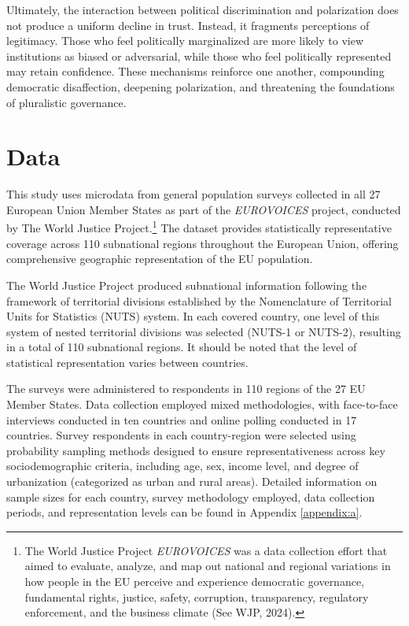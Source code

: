\documentclass{article}
\begin{document}
Ultimately, the interaction between political discrimination and polarization does not produce a uniform decline in trust. Instead, it fragments perceptions of legitimacy. Those who feel politically marginalized are more likely to view institutions as biased or adversarial, while those who feel politically represented may retain confidence. These mechanisms reinforce one another, compounding democratic disaffection, deepening polarization, and threatening the foundations of pluralistic governance.

\section{Data}

This study uses microdata from general population surveys collected in all 27 European Union Member States as part of the \emph{EUROVOICES} project, conducted by The World Justice Project.\footnote{The World Justice Project \emph{EUROVOICES} was a data collection effort that aimed to evaluate, analyze, and map out national and regional variations in how people in the EU perceive and experience democratic governance, fundamental rights, justice, safety, corruption, transparency, regulatory enforcement, and the business climate (See WJP, 2024).} The dataset provides statistically representative coverage across 110 subnational regions throughout the European Union, offering comprehensive geographic representation of the EU population.

The World Justice Project produced subnational information following the framework of territorial divisions established by the Nomenclature of Territorial Units for Statistics (NUTS) system. In each covered country, one level of this system of nested territorial divisions was selected (NUTS-1 or NUTS-2), resulting in a total of 110 subnational regions. It should be noted that the level of statistical representation varies between countries.

The surveys were administered to respondents in 110 regions of the 27 EU Member States. Data collection employed mixed methodologies, with face-to-face interviews conducted in ten countries and online polling conducted in 17 countries. Survey respondents in each country-region were selected using probability sampling methods designed to ensure representativeness across key sociodemographic criteria, including age, sex, income level, and degree of urbanization (categorized as urban and rural areas). Detailed information on sample sizes for each country, survey methodology employed, data collection periods, and representation levels can be found in Appendix \ref{appendix:a}.
\end{document}
